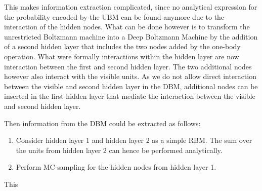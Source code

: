\documentclass{article}
\begin{document}
This makes information extraction complicated, since no analytical expression
for the probability encoded by the UBM can be found anymore due to the
interaction of the hidden nodes. What can be done however is to transform the
unrestricted Boltzmann machine into a Deep Boltzmann Machine by the addition of
a second hidden layer that includes the two nodes added by the one-body
operation. What were formally interactions within the hidden layer are now
interaction between the first and second hidden layer. The two additional nodes
however also interact with the visible units. As we do not allow direct
interaction between the visible and second hidden layer in the DBM, additional
nodes can be inserted in the first hidden layer that mediate the interaction
between the visible and second hidden layer. \par
Then information from the DBM could be extracted as follows:
\begin{enumerate}
  \item Consider hidden layer 1 and hidden layer 2 as a simple RBM. The sum over
  the units from hidden layer 2 can hence be performed analytically.
  \item Perform MC-sampling for the hidden nodes from hidden layer 1.
\end{enumerate}
This 
\end{document}
